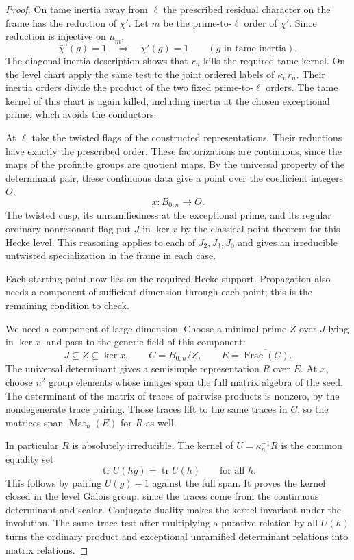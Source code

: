 \begin{proof}
On tame inertia away from \(\ell\) the prescribed residual
character on the frame has the reduction of \(\chi'\). Let \(m\) be the prime-to-\(\ell\) order of \(\chi'\). Since reduction is injective on \(\mu_m\),
\[
 \bar\chi'(g)=1\quad\Longrightarrow\quad\chi'(g)=1\qquad(g\text{ in tame inertia}).
\] The diagonal inertia
description shows that \(r_n\) kills the required tame kernel.
On the level chart apply the same test to the joint ordered
labels of \(\kappa_n r_n\). Their inertia orders divide the
product of the two fixed prime-to-\(\ell\) orders. The tame
kernel of this chart is again killed, including inertia at
the chosen exceptional prime, which avoids the conductors.

At \(\ell\) take the twisted flags of the constructed
representations. Their reductions have exactly the prescribed
order. These factorizations are continuous, since the maps of
the profinite groups are quotient maps. By the universal property of the determinant pair, these continuous data give a point over the coefficient integers \(O\):
\[
 x:B_{0,n}\longrightarrow O .
\]
The twisted cusp, its unramifiedness at the exceptional prime,
and its regular ordinary nonresonant flag put \(J\) in \(\ker x\)
by the classical point theorem for this Hecke level. This
reasoning applies to each of \(J_2,J_3,J_0\) and gives an
irreducible untwisted specialization in the frame in each case.

Each starting point now lies on the required Hecke support. Propagation also needs a component of sufficient dimension through each point; this is the remaining condition to check.

We need a component of large dimension. Choose a minimal prime \(Z\) over \(J\) lying in \(\ker x\), and pass to the generic field of this component:
\[
 J\subseteq Z\subseteq\ker x,\qquad C=B_{0,n}/Z,\qquad E=\overline{\operatorname{Frac}(C)} .
\]
The universal determinant gives a semisimple representation
\(R\) over \(E\). At \(x\), choose \(n^2\) group elements whose
images span the full matrix algebra of the seed. The determinant
of the matrix of traces of pairwise products is nonzero, by the
nondegenerate trace pairing. Those traces lift to the same traces
in \(C\), so the matrices span \(\operatorname{Mat}_n(E)\)
for \(R\) as well.

In particular \(R\) is absolutely irreducible.
The kernel of \(U=\kappa_n^{-1}R\) is the common equality set
\[
                \operatorname{tr}U(hg)=\operatorname{tr}U(h)
                        \qquad\text{for all }h .
\]
This follows by pairing \(U(g)-1\) against the full span. It
proves the kernel closed in the level Galois group, since
the traces come from the continuous determinant and scalar.
Conjugate duality makes the kernel invariant under the
involution. The same trace test after multiplying a putative
relation by all \(U(h)\) turns the ordinary product and
exceptional unramified determinant relations into matrix
relations.


\end{proof}
